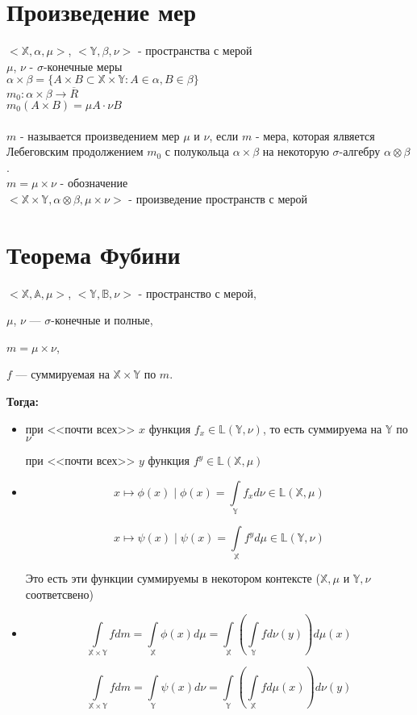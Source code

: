 \documentclass[paper=a4, fontsize=15pt]{article}
\begin{document}
\section{Произведение мер}
$<\mathds{X}, \alpha, \mu>$, $<\mathds{Y}, \beta, \nu>$ - пространства с мерой\\
$\mu$, $\nu$ - $\sigma$-конечные меры\\
$\alpha \times \beta = \{A\times B \subset \mathds{X} \times \mathds{Y} : A \in \alpha, B \in \beta \}$ \\
$m_0 : \alpha \times \beta \rightarrow \overline R$\\ $m_0(A \times B) = \mu A \cdot \nu B$ \\\\
$m$ - называется произведением мер $\mu$ и $\nu$, если $m$ - мера, которая ялвяется Лебеговским продолжением $m_0$ с полукольца $\alpha \times \beta$ на некоторую $\sigma$-алгебру $\alpha \otimes \beta$.\\
$m = \mu \times \nu$ - обозначение \\
$<\mathds{X} \times \mathds{Y}, \alpha \otimes \beta, \mu \times \nu>$ - произведение пространств с мерой

\section{Теорема Фубини}
$<\mathds{X}, \mathds{A}, \mu>$, $<\mathds{Y}, \mathds{B}, \nu>$ - пространство с мерой,

$\mu$, $\nu$ --- $\sigma$-конечные и полные,

$m = \mu \times \nu$,

$f$ --- суммируемая на $\mathds{X} \times \mathds{Y}$ по $m$.

\textbf{Тогда:}
\begin{itemize}
\item
при <<почти всех>> $x$ функция $f_x \in \mathds{L}(\mathds{Y},\nu)$, то есть суммируема на $\mathds{Y}$ по $\nu$

при <<почти всех>> $y$ функция $f^y \in \mathds{L}(\mathds{X},\mu)$

\item
$$x \mapsto \phi(x) \mid \phi(x) = \int\limits_{\mathds{Y}}f_x d\nu \in \mathds{L}(\mathds{X},\mu)$$

$$x \mapsto \psi(x) \mid \psi(x) = \int\limits_{\mathds{X}}f^y d\mu \in \mathds{L}(\mathds{Y},\nu)$$

Это есть эти функции суммируемы в некотором контексте ($\mathds{X},\mu$ и $\mathds{Y},\nu$ соответсвено)

\item
$$\int\limits_{\mathds{X} \times \mathds{Y}} f dm
= \int\limits_{\mathds{X}}\phi(x) d\mu
= \int\limits_{\mathds{X}} (\int\limits_{\mathds{Y}} f d\nu(y)) d\mu(x)$$

$$\int\limits_{\mathds{X} \times \mathds{Y}} f dm
= \int\limits_{\mathds{Y}}\psi(x) d\nu
= \int\limits_{\mathds{Y}} (\int\limits_{\mathds{X}} f d\mu(x)) d\nu(y)$$
\end{itemize}
\end{document}
